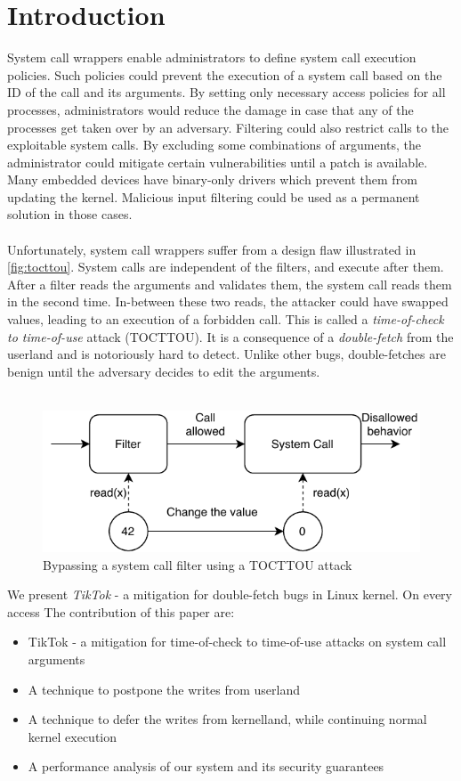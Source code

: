 \section{Introduction}
System call wrappers enable administrators to define system call execution policies. Such policies could prevent the execution of a system call based
on the ID of the call and its arguments. By setting only necessary access policies for all processes, administrators would reduce the damage in case that any of 
the processes get taken over by an adversary. 
Filtering could also restrict calls to the exploitable system calls. By excluding some combinations of arguments, the administrator could mitigate
certain vulnerabilities until a patch is available. Many embedded devices have binary-only drivers which prevent them from updating the kernel.
Malicious input filtering could be used as a permanent solution in those cases.
\\
\\
Unfortunately, system call wrappers suffer from a design flaw illustrated in \autoref{fig:tocttou}. System calls are independent of the filters, and execute after them. After a filter
reads the arguments and validates them, the system call reads them in the second time. In-between these two reads, the attacker could have swapped values,
leading to an execution of a forbidden call. This is called a \emph{time-of-check to time-of-use} attack (TOCTTOU). It is a consequence of a \emph{double-fetch}
from the userland and is notoriously hard to detect. Unlike other bugs, double-fetches are benign until the adversary decides to edit the arguments.
\\
\\
\begin{figure}[]
  \centering
  \includegraphics[width=.85\linewidth]{img/tocttou.pdf}
  \caption{Bypassing a system call filter using a TOCTTOU attack}
  \label{fig:tocttou}
\end{figure}
We present \emph{TikTok} - a mitigation for double-fetch bugs in Linux kernel. On every access
The contribution of this paper are:
\begin{itemize}
\item TikTok - a mitigation for time-of-check to time-of-use attacks on system call arguments
\item A technique to postpone the writes from userland
\item A technique to defer the writes from kernelland, while continuing normal kernel execution
\item A performance analysis of our system and its security guarantees
\end{itemize}

